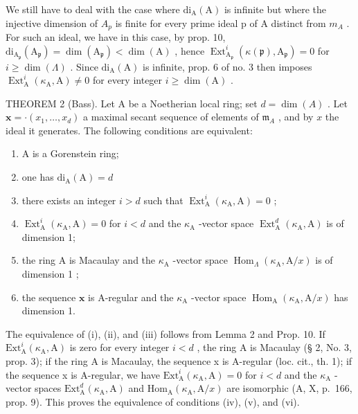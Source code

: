 We still have to deal with the case where \(\mathrm{di}_{\mathrm{A}}(\mathrm{A})\) is infinite but where the injective dimension of \(A_{p}\) is finite for every prime ideal p of A distinct from \(m_{A}\) . For such an ideal, we have in this case, by prop. 10, \(\mathrm{di}_{\mathrm{A}_{\mathfrak{p}}}(\mathrm{A}_{\mathfrak{p}})=\dim(\mathrm{A}_{\mathfrak{p}})<\dim(\mathrm{A})\) , hence \(\operatorname{Ext}_{\mathrm{A}_{\mathfrak{p}}}^{i}(\kappa(\mathfrak{p}),\mathrm{A}_{\mathfrak{p}})=0\) for \(i\geqslant\dim(\Lambda)\) . Since \(\mathrm{di}_{\mathrm{A}}(\mathrm{A})\) is infinite, prop. 6 of no. 3 then imposes \(\operatorname{Ext}_{\mathrm{A}}^{i}(\kappa_{\mathrm{A}},\mathrm{A})\neq0\) for every integer \(i\geqslant\dim(\mathrm{A})\) .

THEOREM 2 (Bass). Let A be a Noetherian local ring; set \(d = \dim(A)\) . Let \(\mathbf{x} = \cdot(x_1, \ldots, x_d)\) a maximal secant sequence of elements of \(\mathfrak{m}_A\) , and by \(x\) the ideal it generates. The following conditions are equivalent:

\begin{enumerate}
\def\labelenumi{(\roman{enumi})}
\item
  A is a Gorenstein ring;
\item
  one has \(\mathrm{di}_{\mathrm{A}}(\mathrm{A}) = d\)
\item
  there exists an integer \(i>d\) such that \(\operatorname{Ext}_{\mathrm{A}}^{i}(\kappa_{\mathrm{A}},\mathrm{A})=0\) ;
\item
  \(\operatorname{Ext}_{\mathrm{A}}^{i}(\kappa_{\mathrm{A}},\mathrm{A}) = 0\) for \(i < d\) and the \(\kappa_{\mathrm{A}}\) -vector space \(\operatorname{Ext}_{\mathrm{A}}^{d}(\kappa_{\mathrm{A}},\mathrm{A})\) is of dimension 1;
\item
  the ring A is Macaulay and the \(\kappa_{\mathrm{A}}\) -vector space \(\operatorname{Hom}_{\Lambda}(\kappa_{\mathrm{A}}, \mathrm{A}/x)\) is of dimension 1 ;
\item
  the sequence \(\mathbf{x}\) is A-regular and the \(\kappa_{\mathrm{A}}\) -vector space \(\operatorname{Hom}_{\mathrm{A}}(\kappa_{\mathrm{A}},\mathrm{A} / x)\) has dimension 1.
\end{enumerate}

The equivalence of (i), (ii), and (iii) follows from Lemma 2 and Prop. 10. If \(\mathrm{Ext}_{\mathrm{A}}^{i}(\kappa_{\mathrm{A}},\mathrm{A})\) is zero for every integer \(i < d\) , the ring A is Macaulay (§ 2, No. 3, prop. 3); if the ring A is Macaulay, the sequence x is A-regular (loc. cit., th. 1); if the sequence x is A-regular, we have \(\mathrm{Ext}_{\mathrm{A}}^{i}(\kappa_{\mathrm{A}},\mathrm{A}) = 0\) for \(i < d\) and the \(\kappa_{\mathrm{A}}\) -vector spaces \(\mathrm{Ext}_{\mathrm{A}}^{d}(\kappa_{\mathrm{A}},\mathrm{A})\) and \(\mathrm{Hom}_{\mathrm{A}}(\kappa_{\mathrm{A}},\mathrm{A}/x)\) are isomorphic (A, X, p.~166, prop. 9). This proves the equivalence of conditions (iv), (v), and (vi).

